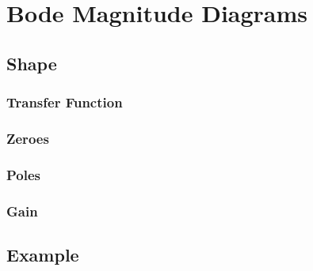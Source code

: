 \section*{Bode Magnitude Diagrams}
\subsection*{Shape}
\subsubsection*{Transfer Function}
\subsubsection*{Zeroes}
\subsubsection*{Poles}
\subsubsection*{Gain}
\subsection*{Example}